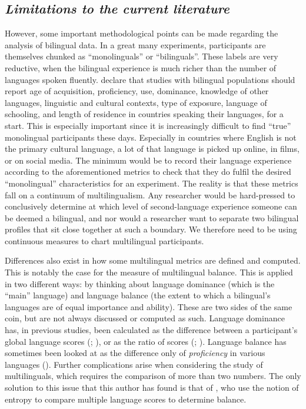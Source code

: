 \subsection{\large{\emph{Limitations to the current literature}}}
\label{LitLimitations}
\noindent
However, some important methodological points can be made regarding the analysis of bilingual data. In a great many experiments, participants are themselves chunked as ``monolinguals'' or ``bilinguals''. These labels are very reductive, when the bilingual experience is much richer than the number of languages spoken fluently. \textcite{Bassetti2022} declare that studies with bilingual populations should report age of acquisition, proficiency, use, dominance, knowledge of other languages, linguistic and cultural contexts, type of exposure, language of schooling, and length of residence in countries speaking their languages, for a start. This is especially important since it is increasingly difficult to find ``true'' monolingual participants these days. Especially in countries where English is not the primary cultural language, a lot of that language is picked up online, in films, or on social media. The minimum would be to record their language experience according to the aforementioned metrics to check that they do fulfil the desired ``monolingual'' characteristics for an experiment. The reality is that these metrics fall on a continuum of multilingualism. Any researcher would be hard-pressed to conclusively determine at which level of second-language experience someone can be deemed a bilingual, and nor would a researcher want to separate two bilingual profiles that sit close together at such a boundary. We therefore need to be using continuous measures to chart multilingual participants.

Differences also exist in how some multilingual metrics are defined and computed. This is notably the case for the measure of multilingual balance. This is applied in two different ways: by thinking about language dominance (which is the ``main'' language) and language balance (the extent to which a bilingual's languages are of equal importance and ability). These are two sides of the same coin, but are not always discussed or computed as such. Language dominance has, in previous studies, been calculated as the difference between a participant's global language scores (\cite{Gertken2014}; \cite{Onnis2018}), or as the ratio of scores (\cite{Flege2002}; \cite{Sheng2014}). Language balance has sometimes been looked at as the difference only of \emph{proficiency} in various languages (\cite{Bartolotti2017}). Further complications arise when considering the study of multilinguals, which requires the comparison of more than two numbers. The only solution to this issue that this author has found is that of \textcite{Gullifer2019}, who use the notion of entropy to compare multiple language scores to determine balance.

